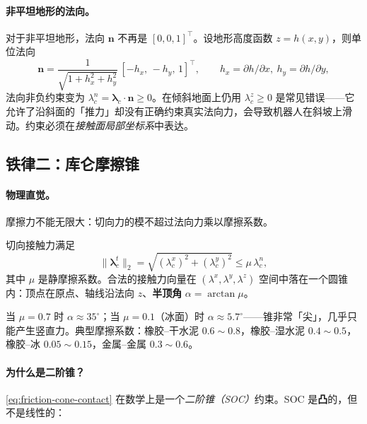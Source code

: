 \paragraph{非平坦地形的法向。}
对于非平坦地形，法向 $\boldsymbol{n}$ 不再是 $[0,0,1]^\top$。设地形高度函数 $z=h(x,y)$，则单位法向
\begin{equation}
  \boldsymbol{n}=\frac{1}{\sqrt{1+h_x^2+h_y^2}}\,[-h_x,\,-h_y,\,1]^\top,\qquad h_x=\partial h/\partial x,\ h_y=\partial h/\partial y,
  \label{eq:terrain-normal}
\end{equation}
法向非负约束变为 $\lambda_c^n=\boldsymbol{\lambda}_c\cdot\boldsymbol{n}\ge0$。在倾斜地面上仍用 $\lambda_c^z\ge0$ 是常见错误——它允许了沿斜面的「推力」却没有正确约束真实法向力，会导致机器人在斜坡上滑动。约束必须在\emph{接触面局部坐标系}中表达。

\subsection{铁律二：库仑摩擦锥}
\label{subsec:friction-cone}

\paragraph{物理直觉。}
摩擦力不能无限大：切向力的模不超过法向力乘以摩擦系数。

\begin{definition}[库仑摩擦锥]
\label{def:friction-cone}
切向接触力满足
\begin{equation}
  \|\boldsymbol{\lambda}_c^t\|_2=\sqrt{(\lambda_c^x)^2+(\lambda_c^y)^2}\le\mu\,\lambda_c^n,
  \label{eq:friction-cone-contact}
\end{equation}
其中 $\mu$ 是静摩擦系数。合法的接触力向量在 $(\lambda^x,\lambda^y,\lambda^z)$ 空间中落在一个圆锥内：顶点在原点、轴线沿法向 $z$、\textbf{半顶角} $\alpha=\arctan\mu$。
\end{definition}

\noindent 当 $\mu=0.7$ 时 $\alpha\approx35^\circ$；当 $\mu=0.1$（冰面）时 $\alpha\approx5.7^\circ$——锥非常「尖」，几乎只能产生竖直力。典型摩擦系数：橡胶--干水泥 $0.6\sim0.8$，橡胶--湿水泥 $0.4\sim0.5$，橡胶--冰 $0.05\sim0.15$，金属--金属 $0.3\sim0.6$。

\paragraph{为什么是二阶锥？}\cref{eq:friction-cone-contact} 在数学上是一个\emph{二阶锥（SOC）}约束。SOC 是\textbf{凸}的，但不是线性的：

